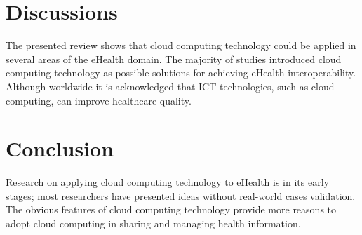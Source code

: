 \documentclass[10pt,a4paper]{article}
\begin{document}
\section{Discussions}
The presented review shows that cloud computing technology could be applied in several areas of the eHealth domain.
The majority of studies introduced cloud computing technology as possible solutions for achieving eHealth interoperability. Although worldwide it is acknowledged that ICT technologies, such as cloud computing, can improve healthcare quality.

\section{Conclusion}
Research on applying cloud computing technology to eHealth is in its early stages; most researchers have presented ideas without real-world cases validation. The obvious features of cloud computing technology provide more reasons to adopt cloud computing in sharing and managing health information. 


\end{document}

